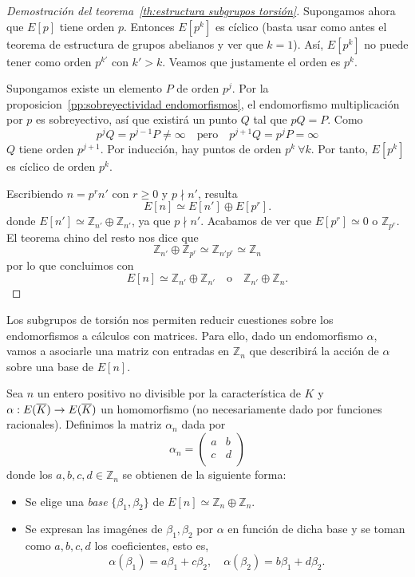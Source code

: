\begin{proof}[Demostración del teorema~\ref{th:estructura subgrupos torsión}]
Supongamos ahora que $E[p]$ tiene orden $p$. Entonces $E[p^k]$ es cíclico (basta usar como antes el teorema de estructura de grupos abelianos y ver que $k = 1$). Así, $E[p^k]$ no puede tener como orden $p^{k'}$ con $k' > k$. Veamos que justamente el orden es $p^k$.

Supongamos existe un elemento $P$ de orden $p^j$. Por la proposicion~\ref{pp:sobreyectividad endomorfismos}, el endomorfismo multiplicación por $p$ es sobreyectivo, así que existirá un punto $Q$ tal que $p Q = P$. Como
$$
	p^j Q = p^{j-1} P \neq \infty \quad \textrm{pero} \quad p^{j+1} Q = p^j P = \infty
$$
$Q$ tiene orden $p^{j+1}$. Por inducción, hay puntos de orden $p^k \ \forall k$. Por tanto, $E[p^k]$ es cíclico de orden $p^k$.

Escribiendo $n = p^r n'$ con $r \geq 0$ y $p \nmid n'$, resulta
$$
	E[n] \simeq E[n'] \oplus E[p^r].
$$
donde $E[n'] \simeq \mathbb{Z}_{n'} \oplus \mathbb{Z}_{n'}$, ya que $p \nmid n'$. Acabamos de ver que $E[p^r] \simeq 0$ o $\mathbb{Z}_{p^r}$. El teorema chino del resto nos dice que
$$
	\mathbb{Z}_{n'} \oplus \mathbb{Z}_{p^r} \simeq \mathbb{Z}_{n' p^r} \simeq \mathbb{Z}_{n}
$$
por lo que concluimos con
$$
	E[n] \simeq \mathbb{Z}_{n'} \oplus \mathbb{Z}_{n'} \quad \textrm{o} \quad  \mathbb{Z}_{n'} \oplus \mathbb{Z}_{n}.
$$
\end{proof}

Los subgrupos de torsión nos permiten reducir cuestiones sobre los endomorfismos a cálculos con matrices. Para ello, dado un endomorfismo $\alpha$, vamos a asociarle una matriz con entradas en $\mathbb{Z}_{n}$ que describirá la acción de $\alpha$ sobre una base de $E[n]$.

\begin{definicion}
	Sea $n$ un entero positivo no divisible por la característica de $K$ y $\alpha: E(\overline{K}) \to E(\overline{K})$ un homomorfismo (no necesariamente dado por funciones racionales). Definimos la matriz $\alpha_n$ dada por
	$$
	\alpha_n =
	\begin{pmatrix}
		a & b \\
		c & d \\
	\end{pmatrix}
	$$
	donde los $a, b, c, d \in \mathbb{Z}_{n}$ se obtienen de la siguiente forma:
	\begin{itemize}
		\item Se elige una \emph{base} $\{ \beta_1, \beta_2 \}$ de $E[n] \simeq  \mathbb{Z}_{n} \oplus  \mathbb{Z}_{n}$.
		\item Se expresan las imagénes de $\beta_1, \beta_2$ por $\alpha$ en función de dicha base y se toman como $a, b, c, d$ los coeficientes, esto es,
		$$
			\alpha(\beta_1) = a \beta_1 + c \beta_2, \quad
			\alpha(\beta_2) = b \beta_1 + d \beta_2.
		$$
	\end{itemize}
\end{definicion}

